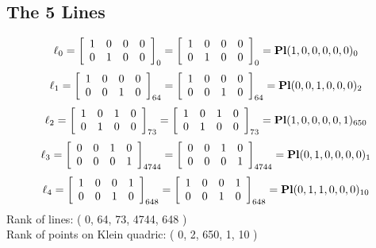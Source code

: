 \documentclass{article}
\begin{document}
{\subsection*{The 5 Lines}
$$
\ell_{0} = 
\left[
\begin{array}{*{4}{r}}
1 & 0 & 0 & 0\\
0 & 1 & 0 & 0\\
\end{array}
\right]
_{0}
=
\left[
\begin{array}{*{4}c}
1  & 0  & 0  & 0\\
0  & 1  & 0  & 0\\
\end{array}
\right]_{0}
={\rm\bf Pl}(1,0,0,0,0,0 )_{0}$$
$$
\ell_{1} = 
\left[
\begin{array}{*{4}{r}}
1 & 0 & 0 & 0\\
0 & 0 & 1 & 0\\
\end{array}
\right]
_{64}
=
\left[
\begin{array}{*{4}c}
1  & 0  & 0  & 0\\
0  & 0  & 1  & 0\\
\end{array}
\right]_{64}
={\rm\bf Pl}(0,0,1,0,0,0 )_{2}$$
$$
\ell_{2} = 
\left[
\begin{array}{*{4}{r}}
1 & 0 & 1 & 0\\
0 & 1 & 0 & 0\\
\end{array}
\right]
_{73}
=
\left[
\begin{array}{*{4}c}
1  & 0  & 1  & 0\\
0  & 1  & 0  & 0\\
\end{array}
\right]_{73}
={\rm\bf Pl}(1,0,0,0,0,1 )_{650}$$
$$
\ell_{3} = 
\left[
\begin{array}{*{4}{r}}
0 & 0 & 1 & 0\\
0 & 0 & 0 & 1\\
\end{array}
\right]
_{4744}
=
\left[
\begin{array}{*{4}c}
0  & 0  & 1  & 0\\
0  & 0  & 0  & 1\\
\end{array}
\right]_{4744}
={\rm\bf Pl}(0,1,0,0,0,0 )_{1}$$
$$
\ell_{4} = 
\left[
\begin{array}{*{4}{r}}
1 & 0 & 0 & 1\\
0 & 0 & 1 & 0\\
\end{array}
\right]
_{648}
=
\left[
\begin{array}{*{4}c}
1  & 0  & 0  & 1\\
0  & 0  & 1  & 0\\
\end{array}
\right]_{648}
={\rm\bf Pl}(0,1,1,0,0,0 )_{10}$$
Rank of lines: ( 0, 64, 73, 4744, 648 )\\
Rank of points on Klein quadric: ( 0, 2, 650, 1, 10 )\\
}
\end{document}
